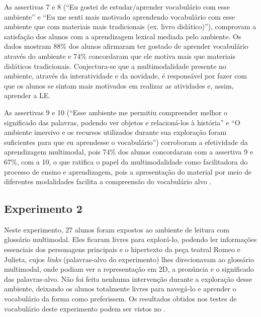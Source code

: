 As assertivas 7 e 8 (``Eu gostei de estudar/aprender vocabulário com
esse ambiente'' e ``Eu me senti mais motivado aprendendo vocabulário com
esse ambiente que com materiais mais tradicionais (ex. livro
didático)''), comprovam a satisfação dos alunos com a aprendizagem
lexical mediada pelo ambiente. Os dados mostram 88\% dos alunos
afirmaram ter gostado de aprender vocabulário através do ambiente e 74\%
concordaram que ele motiva mais que materiais didáticos tradicionais.
Conjectura-se que a multimodalidade presente no ambiente, através da
interatividade e da novidade, é responsável por fazer com que os alunos
se sintam mais motivados em realizar as atividades e, assim, aprender a
LE.

As assertivas 9 e 10 (``Esse ambiente me permitiu compreender melhor o
significado das palavras, podendo ver objetos e relacioná-los à
história'' e ``O ambiente imersivo e os recursos utilizados durante sua
exploração foram suficientes para que eu aprendesse o vocabulário'')
corroboram a efetividade da aprendizagem multimodal, pois 74\% dos
alunos concordaram com a assertiva 9 e 67\%, com a 10, o que ratifica o
papel da multimodalidade como facilitadora do processo de ensino e
aprendizagem, pois a apresentação do material por meio de diferentes
modalidades facilita a compreensão do vocabulário alvo \cite{mayer2001}.

\subsection{Experimento 2}\label{sub-sec-experimento2}

Neste experimento, 27 alunos foram expostos ao ambiente de leitura com
glossário multimodal. Eles ficaram livres para explorá-lo, podendo ler
informações essenciais dos personagens principais e o hipertexto da peça
teatral Romeo e Julieta, cujos \emph{links} (palavras-alvo do
experimento) lhes direcionavam ao glossário multimodal, onde podiam ver
a representação em 2D, a pronúncia e o significado das palavras-alvo.
Não foi feita nenhuma intervenção durante a exploração desse ambiente,
deixando os alunos totalmente livres para navegá-lo e aprender o
vocabulário da forma como preferissem. Os resultados obtidos nos testes
de vocabulário deste experimento podem ser vistos no .

